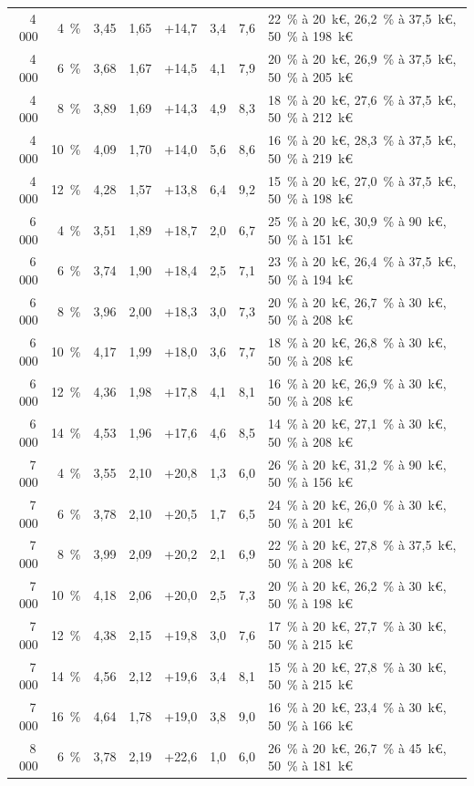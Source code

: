 \begin{table}[!htbp]
{\begin{tabular}{@{}rrrrrrrl@{}}
4\,000 & 4~\% & 3,45 & 1,65 & +14,7 & 3,4 & 7,6 & 22~\% à 20~k€, 26,2~\% à 37,5~k€, 50~\% à 198~k€ \\
4\,000 & 6~\% & 3,68 & 1,67 & +14,5 & 4,1 & 7,9 & 20~\% à 20~k€, 26,9~\% à 37,5~k€, 50~\% à 205~k€ \\
4\,000 & 8~\% & 3,89 & 1,69 & +14,3 & 4,9 & 8,3 & 18~\% à 20~k€, 27,6~\% à 37,5~k€, 50~\% à 212~k€ \\
4\,000 & 10~\% & 4,09 & 1,70 & +14,0 & 5,6 & 8,6 & 16~\% à 20~k€, 28,3~\% à 37,5~k€, 50~\% à 219~k€ \\
4\,000 & 12~\% & 4,28 & 1,57 & +13,8 & 6,4 & 9,2 & 15~\% à 20~k€, 27,0~\% à 37,5~k€, 50~\% à 198~k€ \\
6\,000 & 4~\% & 3,51 & 1,89 & +18,7 & 2,0 & 6,7 & 25~\% à 20~k€, 30,9~\% à 90~k€, 50~\% à 151~k€ \\
6\,000 & 6~\% & 3,74 & 1,90 & +18,4 & 2,5 & 7,1 & 23~\% à 20~k€, 26,4~\% à 37,5~k€, 50~\% à 194~k€ \\
6\,000 & 8~\% & 3,96 & 2,00 & +18,3 & 3,0 & 7,3 & 20~\% à 20~k€, 26,7~\% à 30~k€, 50~\% à 208~k€ \\
6\,000 & 10~\% & 4,17 & 1,99 & +18,0 & 3,6 & 7,7 & 18~\% à 20~k€, 26,8~\% à 30~k€, 50~\% à 208~k€ \\
6\,000 & 12~\% & 4,36 & 1,98 & +17,8 & 4,1 & 8,1 & 16~\% à 20~k€, 26,9~\% à 30~k€, 50~\% à 208~k€ \\
6\,000 & 14~\% & 4,53 & 1,96 & +17,6 & 4,6 & 8,5 & 14~\% à 20~k€, 27,1~\% à 30~k€, 50~\% à 208~k€ \\
7\,000 & 4~\% & 3,55 & 2,10 & +20,8 & 1,3 & 6,0 & 26~\% à 20~k€, 31,2~\% à 90~k€, 50~\% à 156~k€ \\
7\,000 & 6~\% & 3,78 & 2,10 & +20,5 & 1,7 & 6,5 & 24~\% à 20~k€, 26,0~\% à 30~k€, 50~\% à 201~k€ \\
7\,000 & 8~\% & 3,99 & 2,09 & +20,2 & 2,1 & 6,9 & 22~\% à 20~k€, 27,8~\% à 37,5~k€, 50~\% à 208~k€ \\
7\,000 & 10~\% & 4,18 & 2,06 & +20,0 & 2,5 & 7,3 & 20~\% à 20~k€, 26,2~\% à 30~k€, 50~\% à 198~k€ \\
7\,000 & 12~\% & 4,38 & 2,15 & +19,8 & 3,0 & 7,6 & 17~\% à 20~k€, 27,7~\% à 30~k€, 50~\% à 215~k€ \\
7\,000 & 14~\% & 4,56 & 2,12 & +19,6 & 3,4 & 8,1 & 15~\% à 20~k€, 27,8~\% à 30~k€, 50~\% à 215~k€ \\
7\,000 & 16~\% & 4,64 & 1,78 & +19,0 & 3,8 & 9,0 & 16~\% à 20~k€, 23,4~\% à 30~k€, 50~\% à 166~k€ \\
8\,000 & 6~\% & 3,78 & 2,19 & +22,6 & 1,0 & 6,0 & 26~\% à 20~k€, 26,7~\% à 45~k€, 50~\% à 181~k€ \\

\end{tabular}}
\end{table}
